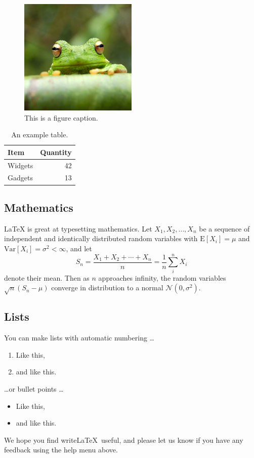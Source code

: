 \documentclass[a4paper,man,natbib]{apa6}
\begin{document}
\begin{figure}
    \centering
    \includegraphics[width=0.5\textwidth]{img/frog.jpg}
    \caption{\label{fig:frog}This is a figure caption.}
\end{figure}

\begin{table}
    \centering
    \begin{tabular}{l|r}
        Item    & Quantity \\\hline
        Widgets & 42       \\
        Gadgets & 13
    \end{tabular}
    \caption{\label{tab:widgets}An example table.}
\end{table}

\subsection{Mathematics}

\LaTeX{} is great at typesetting mathematics. Let $X_1, X_2, \ldots, X_n$ be a sequence of independent and identically distributed random variables with $\text{E}[X_i] = \mu$ and $\text{Var}[X_i] = \sigma^2 < \infty$, and let
$$S_n = \frac{X_1 + X_2 + \cdots + X_n}{n}
    = \frac{1}{n}\sum_{i}^{n} X_i$$
denote their mean. Then as $n$ approaches infinity, the random variables $\sqrt{n}(S_n - \mu)$ converge in distribution to a normal $\mathcal{N}(0, \sigma^2)$.

\subsection{Lists}

You can make lists with automatic numbering \dots

\begin{enumerate}
    \item Like this,
    \item and like this.
\end{enumerate}
\dots or bullet points \dots
\begin{itemize}
    \item Like this,
    \item and like this.
\end{itemize}

We hope you find write\LaTeX\ useful, and please let us know if you have any feedback using the help menu above.


\end{document}
